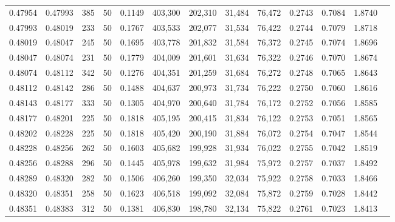 \begin{tabular}{rrrrrrrrrrrrr}
0.47954 & 0.47993 &   385 &  50 &                                     0.1149 & 403,300 & 202,310 &  31,484 &  76,472 & 0.2743 & 0.7084 & 1.8740 \\
0.47993 & 0.48019 &   233 &  50 &                                     0.1767 & 403,533 & 202,077 &  31,534 &  76,422 & 0.2744 & 0.7079 & 1.8718 \\
0.48019 & 0.48047 &   245 &  50 &                                     0.1695 & 403,778 & 201,832 &  31,584 &  76,372 & 0.2745 & 0.7074 & 1.8696 \\
0.48047 & 0.48074 &   231 &  50 &                                     0.1779 & 404,009 & 201,601 &  31,634 &  76,322 & 0.2746 & 0.7070 & 1.8674 \\
0.48074 & 0.48112 &   342 &  50 &                                     0.1276 & 404,351 & 201,259 &  31,684 &  76,272 & 0.2748 & 0.7065 & 1.8643 \\
0.48112 & 0.48142 &   286 &  50 &                                     0.1488 & 404,637 & 200,973 &  31,734 &  76,222 & 0.2750 & 0.7060 & 1.8616 \\
0.48143 & 0.48177 &   333 &  50 &                                     0.1305 & 404,970 & 200,640 &  31,784 &  76,172 & 0.2752 & 0.7056 & 1.8585 \\
0.48177 & 0.48201 &   225 &  50 &                                     0.1818 & 405,195 & 200,415 &  31,834 &  76,122 & 0.2753 & 0.7051 & 1.8565 \\
0.48202 & 0.48228 &   225 &  50 &                                     0.1818 & 405,420 & 200,190 &  31,884 &  76,072 & 0.2754 & 0.7047 & 1.8544 \\
0.48228 & 0.48256 &   262 &  50 &                                     0.1603 & 405,682 & 199,928 &  31,934 &  76,022 & 0.2755 & 0.7042 & 1.8519 \\
0.48256 & 0.48288 &   296 &  50 &                                     0.1445 & 405,978 & 199,632 &  31,984 &  75,972 & 0.2757 & 0.7037 & 1.8492 \\
0.48289 & 0.48320 &   282 &  50 &                                     0.1506 & 406,260 & 199,350 &  32,034 &  75,922 & 0.2758 & 0.7033 & 1.8466 \\
0.48320 & 0.48351 &   258 &  50 &                                     0.1623 & 406,518 & 199,092 &  32,084 &  75,872 & 0.2759 & 0.7028 & 1.8442 \\
0.48351 & 0.48383 &   312 &  50 &                                     0.1381 & 406,830 & 198,780 &  32,134 &  75,822 & 0.2761 & 0.7023 & 1.8413 \\

\end{tabular}
